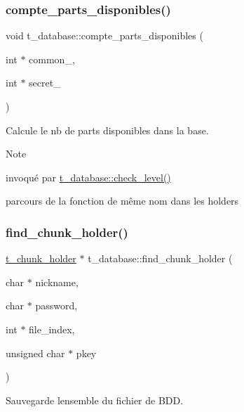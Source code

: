 \subsubsection{\texorpdfstring{compte\+\_\+parts\+\_\+disponibles()}{compte\_parts\_disponibles()}}
{\footnotesize\ttfamily void t\+\_\+database\+::compte\+\_\+parts\+\_\+disponibles (\begin{DoxyParamCaption}\item[{int $\ast$}]{common\+\_\+,  }\item[{int $\ast$}]{secret\+\_\+ }\end{DoxyParamCaption})}



Calcule le nb de parts disponibles dans la base. 

\begin{DoxyNote}{Note}

\begin{DoxyItemize}
\item invoqué par \hyperlink{classt__database_aff1abd122b7ea2dedf36eff44d75f0ef}{t\+\_\+database\+::check\+\_\+level()}
\item parcours de la fonction de même nom dans les holders 
\end{DoxyItemize}
\end{DoxyNote}
\mbox{\label{classt__database_a827029592098239b9d39cb907fb7b305}} 
\subsubsection{\texorpdfstring{find\+\_\+chunk\+\_\+holder()}{find\_chunk\_holder()}}
{\footnotesize\ttfamily \hyperlink{structt__chunk__holder}{t\+\_\+chunk\+\_\+holder} $\ast$ t\+\_\+database\+::find\+\_\+chunk\+\_\+holder (\begin{DoxyParamCaption}\item[{char $\ast$}]{nickname,  }\item[{char $\ast$}]{password,  }\item[{int $\ast$}]{file\+\_\+index,  }\item[{unsigned char $\ast$}]{pkey }\end{DoxyParamCaption})}



Sauvegarde l\textquotesingle{}ensemble du fichier de B\+DD. 

